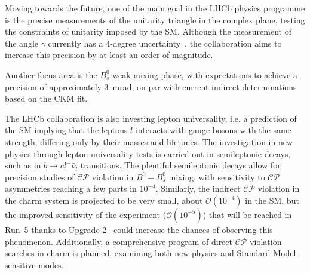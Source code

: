 

Moving towards the future, one of the main goal in the LHCb physics programme is the precise measurements of the unitarity triangle in the complex plane, testing the constraints of unitarity imposed by the SM. 
Although the measurement of the angle $\gamma$ currently has a 4-degree uncertainty~\cite{LHCb:2021dcr}, the collaboration aims to increase this precision by at least an order of magnitude. 

Another focus area is the $B_s^0$ weak mixing phase, with expectations to achieve a precision of approximately \SI{3}{\milli\radian}, on par with current indirect determinations based on the CKM fit.

The LHCb collaboration is also investing lepton universality, i.e. a prediction of the SM implying that the leptons $l$ interacts with gauge bosons with the same strength, differing only by their masses and lifetimes.
The investigation in new physics through lepton universality tests is carried out in semileptonic decays, such as in $b\rightarrow c l^-\bar{\nu}_l$ transitions. The plentiful semileptonic decays allow for precision studies of $\mathcal{CP}$ violation in $B^0-B^0_s$ mixing, with sensitivity to $\mathcal{CP}$ asymmetries reaching a few parts in $10^{−4}$. Similarly, the indirect $\mathcal{CP}$ violation in the charm system is projected to be very small, about $\mathcal{O}(10^{-4})$ in the SM, but the improved sensitivity of the experiment ($\mathcal{O}(10^{−5})$) that will be reached in Run~5 thanks to Upgrade 2~\cite{lhcbcollaboration2019physics} could increase the chances of observing this phenomenon. Additionally, a comprehensive program of direct $\mathcal{CP}$ violation searches in charm is planned, examining both new physics and Standard Model-sensitive modes.

